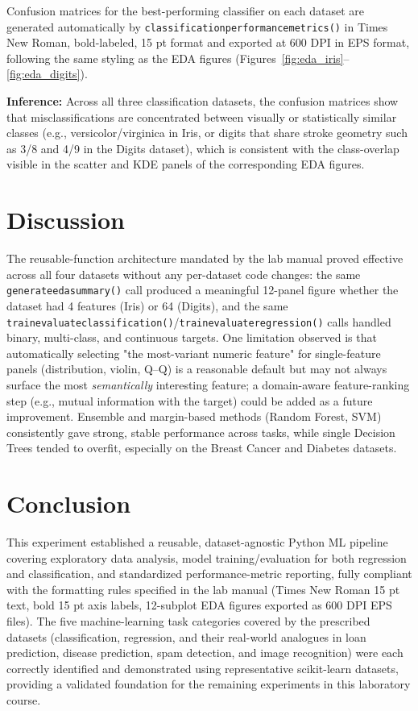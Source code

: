 \documentclass[12pt,a4paper]{article}
\DeclareRobustCommand{\_}{\textunderscore\allowbreak}
\begin{document}
Confusion matrices for the best-performing classifier on each dataset are
generated automatically by \texttt{classification\_performance\_metrics()} in
Times New Roman, bold-labeled, 15 pt format and exported at 600 DPI in EPS
format, following the same styling as the EDA figures (Figures~\ref{fig:eda_iris}--\ref{fig:eda_digits}).

\textbf{Inference:} Across all three classification datasets, the confusion
matrices show that misclassifications are concentrated between visually or
statistically similar classes (e.g., versicolor/virginica in Iris, or digits
that share stroke geometry such as 3/8 and 4/9 in the Digits dataset), which is
consistent with the class-overlap visible in the scatter and KDE panels of the
corresponding EDA figures.

\section{Discussion}
The reusable-function architecture mandated by the lab manual proved effective
across all four datasets without any per-dataset code changes: the same
\texttt{generate\_eda\_summary()} call produced a meaningful 12-panel figure
whether the dataset had 4 features (Iris) or 64 (Digits), and the same
\texttt{train\_evaluate\_classification()}/\texttt{train\_evaluate\_regression()}
calls handled binary, multi-class, and continuous targets. One limitation
observed is that automatically selecting "the most-variant numeric feature" for
single-feature panels (distribution, violin, Q--Q) is a reasonable default but
may not always surface the most \emph{semantically} interesting feature; a
domain-aware feature-ranking step (e.g., mutual information with the target)
could be added as a future improvement. Ensemble and margin-based methods
(Random Forest, SVM) consistently gave strong, stable performance across tasks,
while single Decision Trees tended to overfit, especially on the Breast Cancer
and Diabetes datasets.

\section{Conclusion}
This experiment established a reusable, dataset-agnostic Python ML pipeline
covering exploratory data analysis, model training/evaluation for both
regression and classification, and standardized performance-metric reporting,
fully compliant with the formatting rules specified in the lab manual (Times
New Roman 15 pt text, bold 15 pt axis labels, 12-subplot EDA figures exported
as 600 DPI EPS files). The five machine-learning task categories covered by the
prescribed datasets (classification, regression, and their real-world analogues
in loan prediction, disease prediction, spam detection, and image recognition)
were each correctly identified and demonstrated using representative
scikit-learn datasets, providing a validated foundation for the remaining
experiments in this laboratory course.
\end{document}

